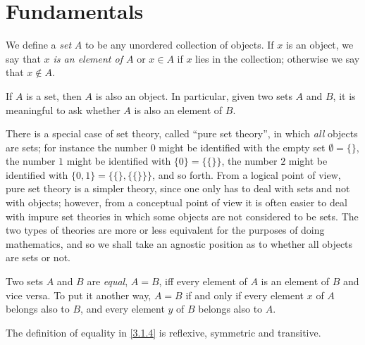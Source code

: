\section{Fundamentals}\label{sec 3.1}

\begin{definition}\label{3.1.1}
  We define a \emph{set} \(A\) to be any unordered collection of objects.
  If \(x\) is an object, we say that \emph{\(x\) is an element of \(A\)} or \(x \in A\) if \(x\) lies in the collection;
  otherwise we say that \(x \notin A\).
\end{definition}

\begin{axiom}\label{3.1}
  If \(A\) is a set, then \(A\) is also an object.
  In particular, given two sets \(A\) and \(B\), it is meaningful to ask whether \(A\) is also an element of \(B\).
\end{axiom}

\setcounter{theorem}{2}
\begin{remark}\label{3.1.3}
  There is a special case of set theory, called ``pure set theory'', in which \emph{all} objects are sets;
  for instance the number \(0\) might be identified with the empty set \(\emptyset = \{\}\), the number \(1\) might be identified with \(\{0\} = \{\{\}\}\), the number \(2\) might be identified with \(\{0, 1\} = \{\{\}, \{\{\}\}\}\), and so forth.
  From a logical point of view, pure set theory is a simpler theory, since one only has to deal with sets and not with objects;
  however, from a conceptual point of view it is often easier to deal with impure set theories in which some objects are not considered to be sets.
  The two types of theories are more or less equivalent for the purposes of doing mathematics, and so we shall take an agnostic position as to whether all objects are sets or not.
\end{remark}

\begin{definition}\label{3.1.4}
  Two sets \(A\) and \(B\) are \emph{equal}, \(A = B\), iff every element of \(A\) is an element of \(B\) and vice versa.
  To put it another way, \(A = B\) if and only if every element \(x\) of \(A\) belongs also to \(B\), and every element \(y\) of \(B\) belongs also to \(A\).
\end{definition}

\begin{additional corollary}\label{ac 3.1.1}
The definition of equality in \cref{3.1.4} is reflexive, symmetric and transitive.
\end{additional corollary}

